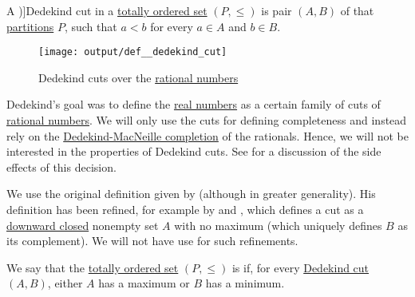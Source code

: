 \begin{definition}\label{def:dedekind_cut}
  A \term[ru=Дедекиндово сечение (\cite[34]{Александров1977Введение})]{Dedekind cut} in a \hyperref[def:totally_ordered_set]{totally ordered set} \( (P, \leq) \) is pair \( (A, B) \) of  that \hyperref[def:set_partition]{partitions} \( P \), such that \( a < b \) for every \( a \in A \) and \( b \in B \).

  \begin{figure}[!ht]
    \centering
    \texttt{[image: output/def\_\_dedekind\_cut]}
    \caption{Dedekind cuts over the \hyperref[def:rational_numbers]{rational numbers}}
    \label{fig:def:dedekind_cut}
  \end{figure}
\end{definition}
\begin{comments}
  \item Dedekind's goal was to define the \hyperref[def:real_numbers]{real numbers} as a certain family of cuts of \hyperref[def:rational_numbers]{rational numbers}. We will only use the cuts for defining completeness and instead rely on the \hyperref[def:dedekind_macnielle_completion]{Dedekind-MacNeille completion} of the rationals. Hence, we will not be interested in the properties of Dedekind cuts. See  for a discussion of the side effects of this decision.

  \item We use the original definition given by  (although in greater generality). His definition has been refined, for example by  and , which defines a cut as a \hyperref[def:closed_ordered_subset]{downward closed} nonempty set \( A \) with no maximum (which uniquely defines \( B \) as its complement). We will not have use for such refinements.
\end{comments}

\begin{definition}\label{def:dedekind_completeness}
  We say that the \hyperref[def:totally_ordered_set]{totally ordered set} \( (P, \leq) \) is  if, for every \hyperref[def:dedekind_cut]{Dedekind cut} \( (A, B) \), either \( A \) has a maximum or \( B \) has a minimum.
\end{definition}

